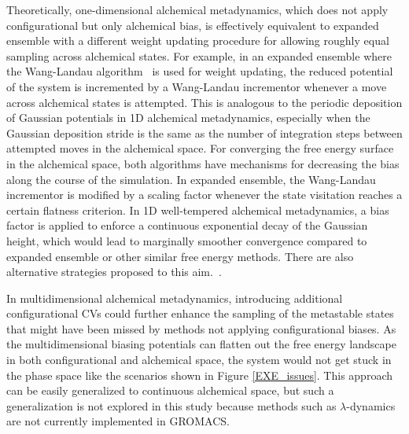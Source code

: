 \documentclass[journal=jacsat,manuscript=article]{achemso}
\begin{document}
Theoretically, one-dimensional alchemical metadynamics, which does not apply configurational but only alchemical bias, is effectively equivalent to expanded ensemble with a different weight updating procedure for allowing roughly equal sampling across alchemical states. For example, in an expanded ensemble where the Wang-Landau algorithm~\cite{desgranges2012evaluation, wang2001efficient, belardinelli2007fast} is used for weight updating, the reduced potential of the system is incremented by a Wang-Landau incrementor whenever a move across alchemical states is attempted. This is analogous to the periodic deposition of Gaussian potentials in 1D alchemical metadynamics, especially when the Gaussian deposition stride is the same as the number of integration steps between attempted moves in the alchemical space. For converging the free energy surface in the alchemical space, both algorithms have mechanisms for decreasing the bias along the course of the simulation. In expanded ensemble, the Wang-Landau incrementor is modified by a scaling factor whenever the state visitation reaches a certain flatness criterion. In 1D well-tempered alchemical metadynamics, a bias factor is applied to enforce a continuous exponential decay of the Gaussian height, which would lead to marginally smoother convergence compared to expanded ensemble or other similar free energy methods. There are also alternative strategies proposed to this aim.~\cite{dama2014transition}.

In multidimensional alchemical metadynamics, introducing additional configurational CVs could further enhance the sampling of the metastable states that might have been missed by methods not applying configurational biases. As the multidimensional biasing potentials can flatten out the free energy landscape in both configurational and alchemical space, the system would not get stuck in the phase space like the scenarios shown in Figure \ref{EXE_issues}. This approach can be easily generalized to continuous alchemical space, but such a generalization is not explored in this study because methods such as $\lambda$-dynamics are not currently implemented in GROMACS. 
\end{document}
